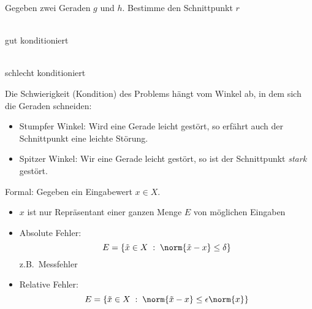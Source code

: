 \medskip

\begin{bsp}
Gegeben zwei Geraden $g$ und $h$. Bestimme den Schnittpunkt $r$
\\
\begin{minipage}{.45\textwidth}
\vspace{1em}
\begin{center}
\\gut konditioniert
\end{center}
\end{minipage}
\begin{minipage}{.45\textwidth}
\vspace{1em}
\begin{center}
\\schlecht konditioniert
\end{center}
\end{minipage}

Die Schwierigkeit (Kondition) des Problems hängt vom Winkel ab, in dem sich die Geraden
schneiden:
\begin{itemize}
 \item Stumpfer Winkel: Wird eine Gerade leicht gestört, so erfährt auch
  der Schnittpunkt eine leichte Störung.
 \item Spitzer Winkel: Wir eine Gerade leicht gestört, so ist der Schnittpunkt \emph{stark} gestört.
\end{itemize}
\end{bsp}

\bigskip

Formal: Gegeben ein Eingabewert $x \in X$.
\begin{itemize}
\item $x$ ist nur Repräsentant einer ganzen Menge $E$ von möglichen Eingaben
\item Absolute Fehler:
\begin{equation*}
E = \{ \tilde{x} \in X \; : \; \norm{\tilde{x} - x} \le \delta \}
\end{equation*}
z.B.\ Messfehler
\item Relative Fehler:
\begin{equation*}
E = \{ \tilde{x} \in X \; : \; \norm{\tilde{x} - x} \le \epsilon \norm{x}\}
\end{equation*}
\end{itemize}

